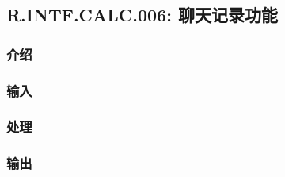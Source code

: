 \subsection{R.INTF.CALC.006: 聊天记录功能}
\subsubsection{介绍}
\subsubsection{输入}
\subsubsection{处理}
\subsubsection{输出}